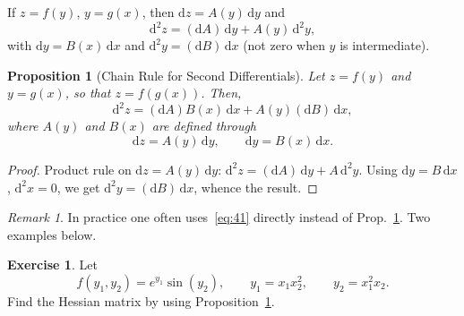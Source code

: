 \documentclass[14pt]{extarticle}
\theoremstyle{plain}
\newtheorem{proposition}{Proposition}
\theoremstyle{definition}
\newtheorem{exercise}{Exercise}
\theoremstyle{remark}
\newtheorem{remark}{Remark}
\newcommand{\dd}{\mathrm{d}}
\begin{document}
If $z = f(y)$, $y = g(x)$, then $\dd z = A(y)\,\dd y$ and
\begin{equation}\label{eq:41}
\dd^2 z = (\dd A)\, \dd y + A(y)\, \dd^2 y,
\end{equation}
with $\dd y = B(x)\,\dd x$ and $\dd^2 y = (\dd B)\,\dd x$ (not zero when $y$ is intermediate).

\begin{proposition}[Chain Rule for Second Differentials]\label{prp:14}
Let $z = f(y)$ and $y = g(x)$, so that $z = f(g(x))$. Then,
\[
\dd^2 z = (\dd A) B(x)\, \dd x + A(y)(\dd B)\, \dd x,
\]
where $A(y)$ and $B(x)$ are defined through
\[
\dd z = A(y)\, \dd y, \qquad \dd y = B(x)\, \dd x.
\]
\end{proposition}

\begin{proof}
Product rule on $\dd z = A(y)\,\dd y$: $\dd^2 z = (\dd A)\,\dd y + A\,\dd^2 y$. Using $\dd y = B\,\dd x$, $\dd^2 x = 0$, we get $\dd^2 y = (\dd B)\,\dd x$, whence the result.
\end{proof}

\begin{remark}
In practice one often uses~\eqref{eq:41} directly instead of Prop.~\ref{prp:14}. Two examples below.
\end{remark}

\begin{exercise}\label{exer:26}
Let
\[
f(y_1, y_2) = e^{y_1} \sin(y_2), \qquad y_1 = x_1 x_2^2, \qquad y_2 = x_1^2 x_2.
\]
Find the Hessian matrix by using Proposition~\ref{prp:14}.
\end{exercise}
\end{document}
